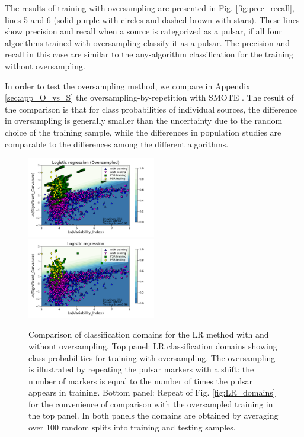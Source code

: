 \documentclass[referee]{aa} %
\begin{document}
The results of training with oversampling are presented  in Fig. \ref{fig:prec_recall},
lines 5 and 6 (solid purple with circles and dashed brown with stars). 
These lines show precision and recall when a source is categorized as a pulsar, if all four algorithms trained with oversampling classify it as a pulsar. The precision and recall in this case are similar to the any-algorithm classification for the training without oversampling.

In order to test the oversampling method, we compare in Appendix \ref{sec:app_O_vs_S} the oversampling-by-repetition with SMOTE \citep{Chawla_2002}. The result of the comparison is that for class probabilities of individual sources, the difference in oversampling is generally smaller than the uncertainty due to the random choice of the training sample, while the differences in population studies are comparable to the differences among the different algorithms.


\begin{figure}[h]
\centering
\includegraphics[width=0.5\textwidth]{plots/classification_domains/lr_200_lbfgs_oversample.pdf} \\
\includegraphics[width=0.5\textwidth]{plots/classification_domains/lr_200_lbfgs.pdf}
\caption{ %
Comparison of classification domains for the LR method with and without oversampling.
Top panel: LR classification domains showing class probabilities for training with oversampling.
The oversampling is illustrated by repeating the pulsar markers with a shift: the number of markers is equal to the number of times the pulsar appears in training.
Bottom panel: Repeat of Fig. \ref{fig:LR_domains} for the convenience of comparison with the oversampled training in the top panel.
In both panels the domains are obtained by averaging over 100 random splits into training and testing samples.
}  
\label{fig:LR_domains_O}
\end{figure}
\end{document}
